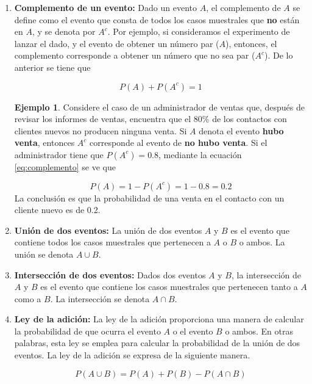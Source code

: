 \documentclass[
  11pt,
]{book}
\theoremstyle{definition}
\theoremstyle{definition}
\newtheorem{example}{Ejemplo}[chapter]
\theoremstyle{definition}
\theoremstyle{definition}
\theoremstyle{remark}
\begin{document}
\begin{enumerate}
\def\labelenumi{\arabic{enumi}.}
\item
  \textbf{Complemento de un evento:} Dado un evento \(A\), el complemento de \(A\) se define como el evento que consta de todos los casos muestrales que \textbf{no} están en \(A\), y se denota por \(A^c\). Por ejemplo, si consideramos el experimento de lanzar el dado, y el evento de obtener un número par (\(A\)), entonces, el complemento corresponde a obtener un número que no sea par (\(A^c\)). De lo anterior se tiene que

  \begin{equation}
  P(A) + P(A^c) = 1
  \label{eq:complemento}
  \end{equation}

  \begin{example}
  Considere el caso de un administrador de ventas que, después de revisar los informes de ventas, encuentra que el 80\% de los contactos con clientes nuevos no producen ninguna venta. Si \(A\) denota el evento \textbf{hubo venta}, entonces \(A^c\) corresponde al evento de \textbf{no hubo venta}. Si el administrador tiene que \(P(A^c) = 0.8\), mediante la ecuación \eqref{eq:complemento} se ve que

  \[P(A) = 1 - P(A^c) = 1 - 0.8 = 0.2\]
  La conclusión es que la probabilidad de una venta en el contacto con un cliente nuevo es de 0.2.
  \end{example}
\item
  \textbf{Unión de dos eventos:} La unión de dos eventos \(A\) y \(B\) es el evento que contiene todos los casos muestrales que pertenecen a \(A\) o \(B\) o ambos. La unión se denota \(A \cup B\).
\item
  \textbf{Intersección de dos eventos:} Dados dos eventos \(A\) y \(B\), la intersección de \(A\) y \(B\) es el evento que contiene los casos muestrales que pertenecen tanto a \(A\) como a \(B\). La intersección se denota \(A \cap B\).
\item
  \textbf{Ley de la adición:} La ley de la adición proporciona una manera de calcular la probabilidad de que ocurra el evento \(A\) o el evento \(B\) o ambos. En otras palabras, esta ley se emplea para calcular la probabilidad de la unión de dos eventos. La ley de la adición se expresa de la siguiente manera.

  \begin{equation}
  P(A\cup B) = P(A) + P(B) - P(A\cap B)
  \label{eq:leyadicion}
  \end{equation}


\end{enumerate}
\end{document}
